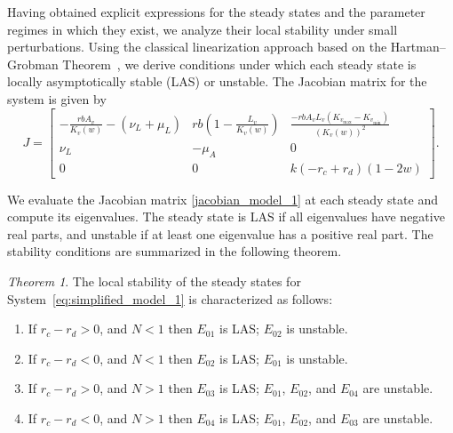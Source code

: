 \documentclass{article}
\theoremstyle{remark}
\theoremstyle{custom} %
\newtheorem{theorem}{Theorem}
\begin{document}
Having obtained explicit expressions for the steady states and the parameter regimes in which they exist, we analyze their local stability under small perturbations. Using the classical linearization approach based on the Hartman–Grobman Theorem~\cite{wiggins2003introduction,strogatz2018nonlinear}, we derive conditions under which each steady state is locally asymptotically stable (LAS) or unstable. The Jacobian matrix for the system is given by
\begin{equation}
J = \begin{bmatrix}
-\frac{r b A_v}{K_v(w)} - (\nu_L + \mu_L) & r b \left(1 - \frac{L_v}{K_v(w)}\right) & \frac{- r b A_v L_v (K_{v_{\max}} - K_{v_{\min}})}{(K_v(w))^2} \\
\nu_L & -\mu_A & 0 \\
0 & 0 & k(-r_c+r_d) (1 - 2w)
\end{bmatrix}.
\label{jacobian_model_1}
\end{equation} 


We evaluate the Jacobian matrix \eqref{jacobian_model_1} at each steady state and compute its eigenvalues. The steady state is LAS if all eigenvalues have negative real parts, and unstable if at least one eigenvalue has a positive real part. The stability conditions are summarized in the following theorem.

\begin{theorem}\label{thm: Baseline Model}
The local stability of the steady states for System~\eqref{eq:simplified_model_1} is characterized as follows:
\begin{enumerate}
\item If \( r_c - r_d > 0 \), and $N<1$ then $E_{01}$ is LAS; $E_{02}$ is unstable.

\item If \( r_c - r_d < 0 \), and $N<1$ then $E_{02}$ is LAS; $E_{01}$ is unstable.

\item If \( r_c - r_d > 0 \), and $N>1$ then $E_{03}$ is LAS; $E_{01}$, $E_{02}$, and $E_{04}$ are unstable.

\item If \( r_c - r_d < 0 \), and $N>1$ then $E_{04}$ is LAS; $E_{01}$, $E_{02}$, and $E_{03}$ are unstable.


\end{enumerate}



\end{theorem}
\color{black}
\end{document}
